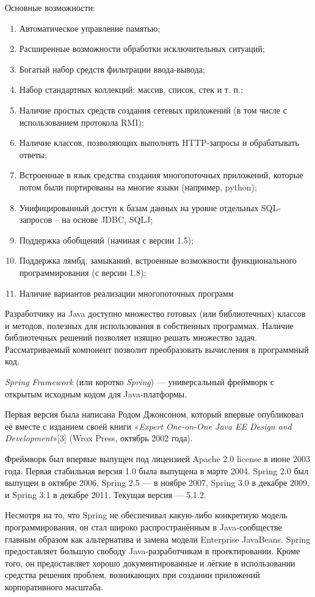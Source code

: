 Основные возможности:

\begin{enumerate}
	\item Автоматическое управление памятью;
	\item Расширенные возможности обработки исключительных ситуаций;
	\item Богатый набор средств фильтрации ввода-вывода;
	\item Набор стандартных коллекций: массив, список, стек и т. п.;
	\item Наличие простых средств создания сетевых приложений (в том числе с использованием протокола RMI);
	\item Наличие классов, позволяющих выполнять HTTP-запросы и обрабатывать ответы;
	\item Встроенные в язык средства создания многопоточных приложений, которые потом были портированы на многие языки (например, python);
	\item Унифицированный доступ к базам данных на уровне отдельных SQL-запросов – на основе JDBC, SQLJ;
	\item Поддержка обобщений (начиная с версии 1.5);
	\item Поддержка лямбд, замыканий, встроенные возможности функционального программирования (с версии 1.8);
	\item Наличие вариантов реализации многопоточных программ
\end{enumerate}

Разработчику на Java доступно множество готовых (или библиотечных) классов и методов, полезных для использования в собственных программах. Наличие библиотечных решений позволяет изящно решать множество задач. Рассматриваемый компонент позволит преобразовать вычисления в программный код.

\textit{Spring Framework} (или коротко \textit{Spring}) — универсальный фреймворк с открытым исходным кодом для Java-платформы. 

Первая версия была написана Родом Джонсоном, который впервые опубликовал её вместе с изданием своей книги «\textit{Expert One-on-One Java EE Design and Development}»[3] (Wrox Press, октябрь 2002 года).

Фреймворк был впервые выпущен под лицензией Apache 2.0 license в июне 2003 года. Первая стабильная версия 1.0 была выпущена в марте 2004. Spring 2.0 был выпущен в октябре 2006, Spring 2.5 — в ноябре 2007, Spring 3.0 в декабре 2009, и Spring 3.1 в декабре 2011. Текущая версия — 5.1.2.

Несмотря на то, что Spring не обеспечивал какую-либо конкретную модель программирования, он стал широко распространённым в Java-сообществе главным образом как альтернатива и замена модели Enterprise JavaBeans. Spring предоставляет большую свободу Java-разработчикам в проектировании. Кроме того, он предоставляет хорошо документированные и лёгкие в использовании средства решения проблем, возникающих при создании приложений корпоративного масштаба.

